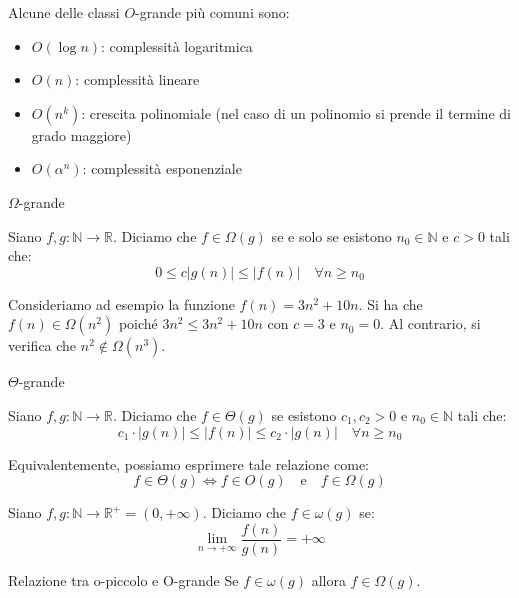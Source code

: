 \documentclass[12pt]{report}
\begin{document}
	Alcune delle classi $O$-grande più comuni sono:
	\begin{itemize}
		
		\item $O(\log n)$: complessità logaritmica
		
		\item $O(n)$: complessità lineare
		
		\item $O(n^k)$: crescita polinomiale (nel caso di un polinomio si prende il termine di grado maggiore)
		
		\item $O(\alpha^n)$: complessità esponenziale
		
	\end{itemize}
	
	\begin{definizione}{$\Omega$-grande}{}
		
		Siano $f, g: \mathbb{N} \to \mathbb{R}$. Diciamo che $f \in \Omega(g)$ se e solo se esistono $n_0 \in \mathbb{N}$ e $c > 0$ tali che:
		\[
		0 \le c|g(n)| \le |f(n)| \quad \forall n \ge n_0
		\]
		
	\end{definizione}
	
	Consideriamo ad esempio la funzione $f(n) = 3n^2 + 10n$. Si ha che $f(n) \in \Omega(n^2)$ poiché $3n^2 \le 3n^2 + 10n$ con $c = 3$ e $n_0 = 0$. Al contrario, si verifica che $n^2 \notin \Omega(n^3)$.
	
	\begin{definizione}{$\Theta$-grande}{}
		
		Siano $f, g: \mathbb{N} \to \mathbb{R}$. Diciamo che $f \in \Theta(g)$ se esistono $c_1, c_2 > 0$ e $n_0 \in \mathbb{N}$ tali che:
		\[
		c_1 \cdot |g(n)| \le |f(n)| \le c_2 \cdot |g(n)| \quad \forall n \ge n_0
		\]
		
		Equivalentemente, possiamo esprimere tale relazione come:
		\[
		f \in \Theta(g) \iff f \in O(g) \quad \text{e} \quad f \in \Omega(g)
		\]
		
	\end{definizione}
	
	\begin{definizione}{}{}
		
		Siano $f, g: \mathbb{N} \to \mathbb{R}^+ = (0, +\infty)$. Diciamo che $f \in \omega(g)$ se:
		\[
		\lim_{n \to +\infty} \frac{f(n)}{g(n)} = +\infty
		\]
		
	\end{definizione}
	
	\begin{teorema}{Relazione tra o-piccolo e O-grande}{}
		Se $f \in \omega(g)$ allora $f \in \Omega(g)$.
	\end{teorema}
	
\end{document}
